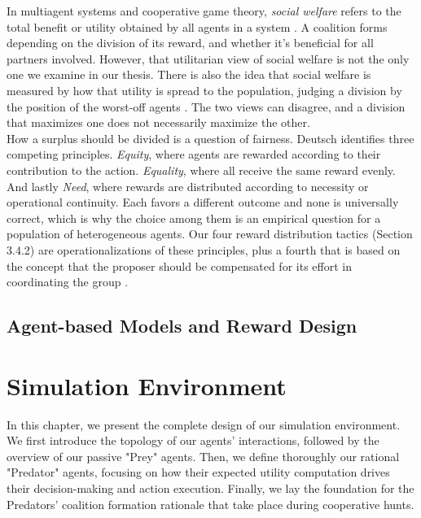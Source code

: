 \documentclass[12pt,a4paper]{report}
\begin{document}
	In multiagent systems and cooperative game theory, \textit{social welfare} refers to the total benefit or utility obtained by all agents in a system \cite{Chalkiadakis2011}. A coalition forms depending on the division of its reward, and whether it's beneficial for all partners involved. However, that utilitarian view of social welfare is not the only one we examine in our thesis. There is also the idea that social welfare is measured by how that utility is spread to the population, judging a division by the position of the worst-off agents \cite{Sen2017}. The two views can disagree, and a division that maximizes one does not necessarily maximize the other. \\

	How a surplus should be divided is a question of fairness. Deutsch \cite{Deutsch1975} identifies three competing principles. \textit{Equity}, where agents are rewarded according to their contribution to the action. \textit{Equality}, where all receive the same reward evenly. And lastly \textit{Need}, where rewards are distributed according to necessity or operational continuity. Each favors a different outcome and none is universally correct, which is why the choice among them is an empirical question for a population of heterogeneous agents. Our four reward distribution tactics (Section 3.4.2) are operationalizations of these principles, plus a fourth that is based on the concept that the proposer should be compensated for its effort in coordinating the group \cite{Chalkiadakis2011}.

	\section{Agent-based Models and Reward Design}



	\chapter{Simulation Environment}
	\label{ch:approach}
	In this chapter, we present the complete design of our simulation environment. We first introduce the topology of our agents' interactions, followed by the overview of our passive "Prey" agents. Then, we define thoroughly our rational "Predator" agents, focusing on how their expected utility computation drives their decision-making and action execution. Finally, we lay the foundation for the Predators' coalition formation rationale that take place during cooperative hunts.   
	
\end{document}
